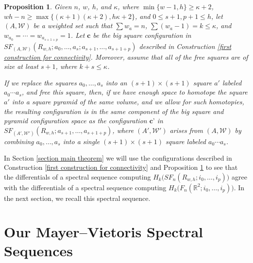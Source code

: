 \documentclass[pagebackref,colorlinks,citecolor=blue,linkcolor=blue,urlcolor=blue,filecolor=blue]{article}
\newtheorem{prop}[thm]{Proposition}
\theoremstyle{definition}\newtheorem{definition}[thm]{Definition}
\theoremstyle{definition}
\newcommand{\R}{\ensuremath{\mathbb{R}}}
\begin{document}
\begin{prop}\label{move the big stretchy squares around}
Given $n$, $w$, $h$, and $\kappa$, where $\min\{w-1,h\}\ge \kappa+2$, $wh-n\ge \max\big\{(\kappa+1)(\kappa+2), h\kappa+2\big\}$,
and $0\le s+1, p+1\le h$,
let $(A, \mathcal{W})$ be a weighted set such that $\sum w_{a}=n$, $\sum(w_{a}-1)=k\le \kappa$, and $w_{a_{0}}=\cdots=w_{a_{s+1+p}}=1$.
Let $\textbf{c}$ be the big square configuration in $SF_{(A, \mathcal{W})}(R_{w, h}; a_{0},\dots, a_{s};a_{s+1},\dots, a_{s+1+p})$ described in Construction \ref{first construction for connectivity}.
Moreover, assume that all of the free squares are of size at least $s+1$, where $k+s\le \kappa$.

If we replace the squares $a_{0},\dots, a_{s}$ into an $(s+1)\times (s+1)$ square $a'$ labeled $a_{0}\cdots a_{s}$, and free this square, then, if we have enough space to homotope the square $a'$ into a square pyramid of the same volume, and we allow for such homotopies, the resulting configuration is in the same component of the big square and pyramid configuration space as the configuration $\textbf{c'}$ in $SF_{(A', \mathcal{W}')}(R_{w, h};a_{s+1},\dots, a_{s+1+p})$, where $(A', \mathcal{W}')$ arises from $(A, \mathcal{W})$ by combining $a_{0}, \dots, a_{s}$ into a single $(s+1)\times (s+1)$ square labeled $a_{0}\cdots a_{s}$.
\end{prop}

In Section \ref{section main theorem} we will use the configurations described in Construction \ref{first construction for connectivity} and Proposition \ref{move the big stretchy squares around} to see that the differentials of a spectral sequence computing $H_{k}\big(SF_{n}(R_{w,h}; i_{0}, \dots, i_{p})\big)$ agree with the differentials of a spectral sequence computing $H_{k}\big(F_{n}(\R^{2}; i_{0}, \dots, i_{p})\big)$.
In the next section, we recall this spectral sequence.

\section{Our Mayer--Vietoris Spectral Sequences}\label{augmented MV}
\end{document}
